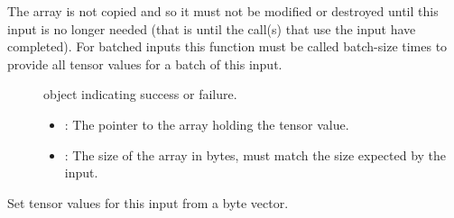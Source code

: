 \documentclass[letterpaper,10pt,english]{sphinxmanual}
\begin{document}
\begin{fulllineitems}
\begin{fulllineitems}
The array is not copied and so it must not be modified or destroyed until this input is no longer needed (that is until the {\hyperref[\detokenize{cpp_api/classnvidia_1_1inferenceserver_1_1client_1_1InferContext:classnvidia_1_1inferenceserver_1_1client_1_1InferContext_1a4cac8002817c9259851305b14c258f36}]{}} call(s) that use the input have completed). For batched inputs this function must be called batch-size times to provide all tensor values for a batch of this input. \begin{description}
\item[{}] \leavevmode
{\hyperref[\detokenize{cpp_api/classnvidia_1_1inferenceserver_1_1client_1_1Error:classnvidia_1_1inferenceserver_1_1client_1_1Error}]{}} object indicating success or failure. 

\item[{}] \leavevmode\begin{itemize}
\item {} 
: The pointer to the array holding the tensor value. 

\item {} 
: The size of the array in bytes, must match the size expected by the input. 

\end{itemize}

\end{description}


\end{fulllineitems}


\begin{fulllineitems}
\label{\detokenize{cpp_api/classnvidia_1_1inferenceserver_1_1client_1_1InferContext_1_1Input:_CPPv4N6nvidia15inferenceserver6client12InferContext5Input6SetRawERKNSt6vectorI7uint8_tEE}}%
\pysigstartmultiline
{}\label{\detokenize{cpp_api/classnvidia_1_1inferenceserver_1_1client_1_1InferContext_1_1Input:classnvidia_1_1inferenceserver_1_1client_1_1InferContext_1_1Input_1a094ec9eece1e10d877db9af69867090e}}%
\pysigstopmultiline
Set tensor values for this input from a byte vector. 


\end{fulllineitems}
\end{fulllineitems}
\end{document}
